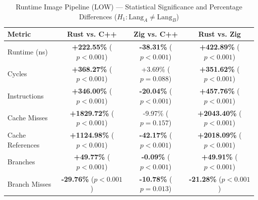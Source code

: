 \begin{table}[htbp]
\centering
\caption{Runtime Image Pipeline (LOW) --- Statistical Significance and Percentage Differences ($H_1: \text{Lang}_A \neq \text{Lang}_B$)}
\label{tab:image_pipeline_runtime_LOW_false_false_false}
\begin{tabular}{l ccc}
\toprule
\textbf{Metric} & \textbf{Rust vs. C++} & \textbf{Zig vs. C++} & \textbf{Rust vs. Zig} \\
\midrule
Runtime (ns) & \textbf{+222.55\%} ($p < 0.001$) & \textbf{-38.31\%} ($p < 0.001$) & \textbf{+422.89\%} ($p < 0.001$) \\
Cycles & \textbf{+368.27\%} ($p < 0.001$) & +3.69\% ($p = 0.088$) & \textbf{+351.62\%} ($p < 0.001$) \\
Instructions & \textbf{+346.00\%} ($p < 0.001$) & \textbf{-20.04\%} ($p < 0.001$) & \textbf{+457.76\%} ($p < 0.001$) \\
Cache Misses & \textbf{+1829.72\%} ($p < 0.001$) & -9.97\% ($p = 0.157$) & \textbf{+2043.40\%} ($p < 0.001$) \\
Cache References & \textbf{+1124.98\%} ($p < 0.001$) & \textbf{-42.17\%} ($p < 0.001$) & \textbf{+2018.09\%} ($p < 0.001$) \\
Branches & \textbf{+49.77\%} ($p < 0.001$) & \textbf{-0.09\%} ($p < 0.001$) & \textbf{+49.91\%} ($p < 0.001$) \\
Branch Misses & \textbf{-29.76\%} ($p < 0.001$) & \textbf{-10.78\%} ($p = 0.013$) & \textbf{-21.28\%} ($p < 0.001$) \\
\bottomrule
\end{tabular}
\end{table}


